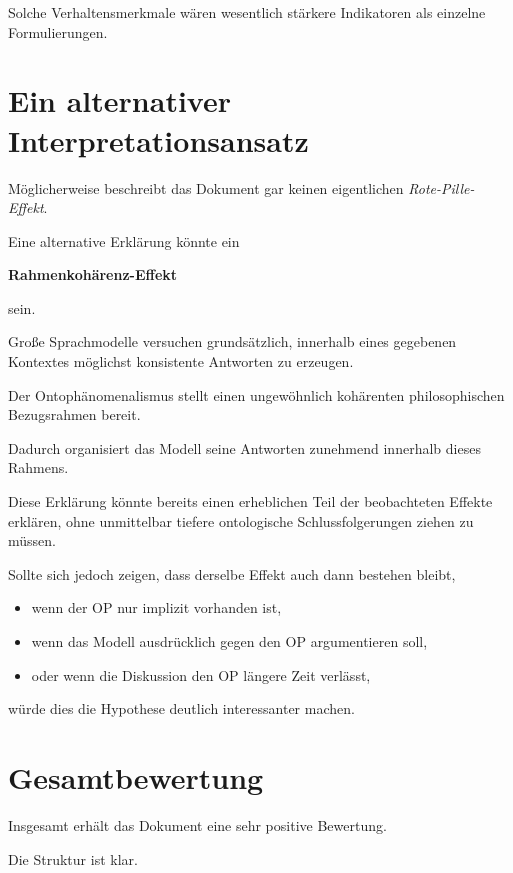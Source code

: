 Solche Verhaltensmerkmale wären wesentlich stärkere Indikatoren als einzelne Formulierungen.

\bigskip

\section*{Ein alternativer Interpretationsansatz}

Möglicherweise beschreibt das Dokument gar keinen eigentlichen
\emph{Rote-Pille-Effekt}.

Eine alternative Erklärung könnte ein

\begin{center}
\textbf{Rahmenkohärenz-Effekt}
\end{center}

sein.

Große Sprachmodelle versuchen grundsätzlich, innerhalb eines gegebenen Kontextes möglichst konsistente Antworten zu erzeugen.

Der Ontophänomenalismus stellt einen ungewöhnlich kohärenten philosophischen Bezugsrahmen bereit.

Dadurch organisiert das Modell seine Antworten zunehmend innerhalb dieses Rahmens.

Diese Erklärung könnte bereits einen erheblichen Teil der beobachteten Effekte erklären, ohne unmittelbar tiefere ontologische Schlussfolgerungen ziehen zu müssen.

Sollte sich jedoch zeigen, dass derselbe Effekt auch dann bestehen bleibt,

\begin{itemize}
\item wenn der OP nur implizit vorhanden ist,
\item wenn das Modell ausdrücklich gegen den OP argumentieren soll,
\item oder wenn die Diskussion den OP längere Zeit verlässt,
\end{itemize}

würde dies die Hypothese deutlich interessanter machen.

\bigskip

\section*{Gesamtbewertung}

Insgesamt erhält das Dokument eine sehr positive Bewertung.

Die Struktur ist klar.

